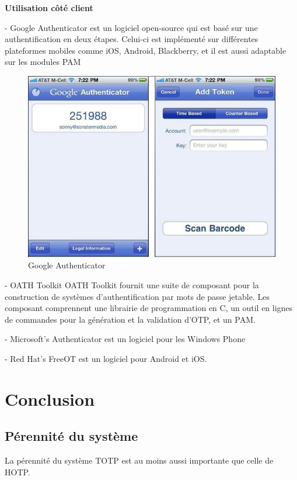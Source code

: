\documentclass{../res/univ-projet}
\begin{document}
\begin{description}
   \item \textbf{Utilisation côté client}
   \begin{description}
    \item - Google Authenticator est un logiciel open-source qui est basé sur une authentification en deux étapes. Celui-ci est implémenté sur différentes plateformes 
          mobiles comme iOS, Android, Blackberry, et il est aussi adaptable sur les modules PAM
          \begin{figure}[h!]
            \centerline{\includegraphics[scale=0.45]{imgHOTP/GoogleAuthenticator_2.jpg}}
            \caption{Google Authenticator}
          \end{figure}  
    \item - OATH Toolkit OATH Toolkit fournit une suite de composant pour la construction de systèmes d'authentification par mots de passe jetable. 
          Les composant comprennent une librairie de programmation en C, un outil en lignes de commandes pour la génération et la validation d'OTP, et un PAM.
    \item - Microsoft's Authenticator est un logiciel pour les Windows Phone
    \item - Red Hat's FreeOT est un logiciel pour Android et iOS.
   \end{description}
  \end{description}
  
\section{Conclusion}
  \subsection{Pérennité du système}
   La pérennité du système TOTP est au moins aussi importante que celle de HOTP.
\end{document}
